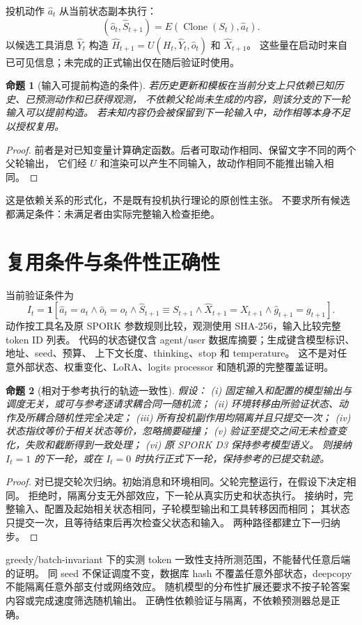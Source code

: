 \documentclass[UTF8,11pt]{ctexart}
\newtheorem{proposition}{命题}
\newcommand{\ind}{\mathbf{1}}
\begin{document}
投机动作 $\hat a_t$ 从当前状态副本执行：
\[
(\hat o_t,\hat S_{t+1})=E(\operatorname{Clone}(S_t),\hat a_t).
\]
以候选工具消息 $\hat Y_t$ 构造 $\hat H_{t+1}=U(H_t,\hat Y_t,\hat o_t)$ 和 $\hat X_{t+1}$。
这些量在启动时来自已可见信息；未完成的正式输出仅在随后验证时使用。

\begin{proposition}[输入可提前构造的条件]
若历史更新和模板在当前分支上只依赖已知历史、已预测动作和已获得观测，
不依赖父轮尚未生成的内容，则该分支的下一轮输入可以提前构造。
若未知内容仍会被保留到下一轮输入中，动作相等本身不足以授权复用。
\end{proposition}
\begin{proof}
前者是对已知变量计算确定函数。后者可取动作相同、保留文字不同的两个父轮输出，
它们经 $U$ 和渲染可以产生不同输入，故动作相同不能推出输入相同。
\end{proof}
这是依赖关系的形式化，不是既有投机执行理论的原创性主张。
不要求所有候选都满足条件：未满足者由实际完整输入检查拒绝。

\section{复用条件与条件性正确性}
当前验证条件为
\[
I_t=\ind\!\left[
\hat a_t=a_t\land\hat o_t=o_t\land\hat S_{t+1}\equiv S_{t+1}
\land\hat X_{t+1}=X_{t+1}\land\hat g_{t+1}=g_{t+1}
\right].
\]
动作按工具名及原 SPORK 参数规则比较，观测使用 SHA-256，输入比较完整 token ID 列表。
代码的状态键仅含 agent/user 数据库摘要；生成键含模型标识、地址、seed、预算、
上下文长度、thinking、stop 和 temperature。
这不是对任意外部状态、权重变化、LoRA、logits processor 和随机源的完整覆盖证明。

\begin{proposition}[相对于参考执行的轨迹一致性]
假设：
(i) 固定输入和配置的模型输出与调度无关，或可与参考逐请求耦合同一随机流；
(ii) 环境转移由所验证状态、动作及所耦合随机性完全决定；
(iii) 所有投机副作用均隔离并且只提交一次；
(iv) 状态指纹等价于相关状态等价，忽略摘要碰撞；
(v) 验证至提交之间无未检查变化，失败和截断得到一致处理；
(vi) 原 SPORK D3 保持参考模型语义。
则接纳 $I_t=1$ 的下一轮，或在 $I_t=0$ 时执行正式下一轮，保持参考的已提交轨迹。
\end{proposition}
\begin{proof}
对已提交轮次归纳。初始消息和环境相同。父轮完整运行，在假设下决定相同。
拒绝时，隔离分支无外部效应，下一轮从真实历史和状态执行。
接纳时，完整输入、配置及起始相关状态相同，子轮模型输出和工具转移因而相同；
其状态只提交一次，且等待结束后再次检查父状态和输入。
两种路径都建立下一归纳步。
\end{proof}
greedy/batch-invariant 下的实测 token 一致性支持所测范围，不能替代任意后端的证明。
同 seed 不保证调度不变，数据库 hash 不覆盖任意外部状态，deepcopy 不能隔离任意外部支付或网络效应。
随机模型的分布性扩展还要求不按子轮答案内容或完成速度筛选随机输出。
正确性依赖验证与隔离，不依赖预测器总是正确。
\end{document}

